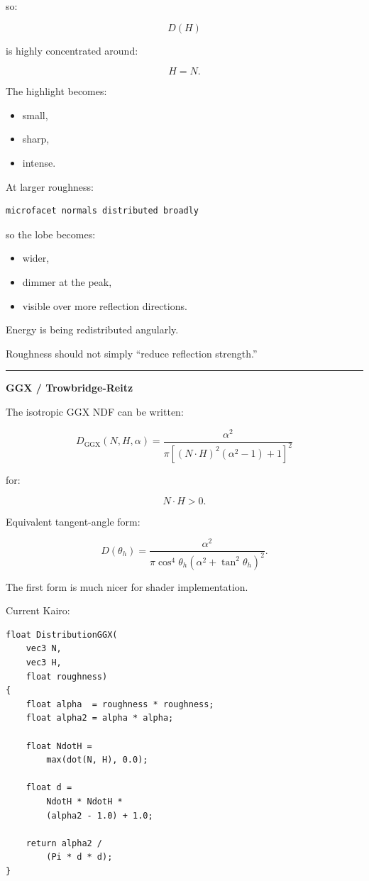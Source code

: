 so:

\[
D(H)
\]

is highly concentrated around:

\[
H=N.
\]

The highlight becomes:

\begin{itemize}
\tightlist
\item
  small,
\item
  sharp,
\item
  intense.
\end{itemize}

At larger roughness:

\begin{verbatim}
microfacet normals distributed broadly
\end{verbatim}

so the lobe becomes:

\begin{itemize}
\tightlist
\item
  wider,
\item
  dimmer at the peak,
\item
  visible over more reflection directions.
\end{itemize}

Energy is being redistributed angularly.

Roughness should not simply ``reduce reflection strength.''

\begin{center}\rule{0.5\linewidth}{0.5pt}\end{center}

\textbf{GGX / Trowbridge-Reitz}

The isotropic GGX NDF can be written:

\[
\boxed{
D_{\mathrm{GGX}}(N,H,\alpha)
=
\frac{
\alpha^2
}{
\pi
\left[
(N\cdot H)^2(\alpha^2-1)+1
\right]^2
}
}
\]

for:

\[
N\cdot H>0.
\]

Equivalent tangent-angle form:

\[
D(\theta_h)
=
\frac{
\alpha^2
}{
\pi
\cos^4\theta_h
(\alpha^2+\tan^2\theta_h)^2
}.
\]

The first form is much nicer for shader implementation.

Current Kairo:

\begin{verbatim}
float DistributionGGX(
    vec3 N,
    vec3 H,
    float roughness)
{
    float alpha  = roughness * roughness;
    float alpha2 = alpha * alpha;

    float NdotH =
        max(dot(N, H), 0.0);

    float d =
        NdotH * NdotH *
        (alpha2 - 1.0) + 1.0;

    return alpha2 /
        (Pi * d * d);
}
\end{verbatim}

